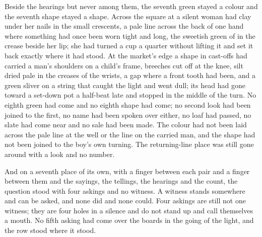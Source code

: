 Beside the hearings but never among them, the seventh green stayed a colour and the seventh shape stayed a shape. Across the square at  a silent woman had clay under her nails in the small crescents, a pale line across the back of one hand where something had once been worn tight and long, the sweetish green of  in the crease beside her lip; she had turned a cup a quarter without lifting it and set it back exactly where it had stood. At the market's edge a shape in cast-offs had carried a man's shoulders on a child's frame, breeches cut off at the knee, silt dried pale in the creases of the wrists, a gap where a front tooth had been, and a green sliver on a string that caught the light and went dull; its head had gone toward a set-down pot a half-beat late and stopped in the middle of the turn. No eighth green had come and no eighth shape had come; no second look had been joined to the first, no name had been spoken over either, no loaf had passed, no slate had come near and no sale had been made. The colour had not been laid across the pale line at the well or the line on the carried man, and the shape had not been joined to the boy's own turning. The returning-line place was still gone around with a look and no number.

And on a seventh place of its own, with a finger between each pair and a finger between them and the sayings, the tellings, the hearings and the count, the question stood with four askings and no witness. A witness stands somewhere and can be asked, and none did and none could. Four askings are still not one witness; they are four holes in a silence and do not stand up and call themselves a mouth. No fifth asking had come over the boards in the going of the light, and the row stood where it stood.

